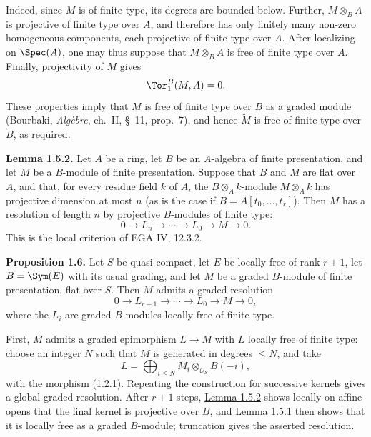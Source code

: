 Indeed, since \(M\) is of finite type, its degrees are bounded below. Further, \(M\otimes_B A\) is projective of finite type over \(A\), and therefore has only finitely many non-zero homogeneous components, each projective of finite type over \(A\). After localizing on \(\Spec(A)\), one may thus suppose that \(M\otimes_B A\) is free of finite type over \(A\). Finally, projectivity of \(M\) gives
\[
 \Tor_1^B(M,A)=0.
\]
These properties imply that \(M\) is free of finite type over \(B\) as a graded module (Bourbaki, \emph{Algèbre}, ch.~II, \S~11, prop.~7), and hence \(\widetilde M\) is free of finite type over \(\widetilde B\), as required.

\textbf{Lemma 1.5.2.} Let \(A\) be a ring, let \(B\) be an \(A\)-algebra of finite presentation, and let \(M\) be a \(B\)-module of finite presentation. Suppose that \(B\) and \(M\) are flat over \(A\), and that, for every residue field \(k\) of \(A\), the \(B\otimes_A k\)-module \(M\otimes_A k\) has projective dimension at most \(n\) (as is the case if \(B=A[t_0,\ldots,t_r]\)). Then \(M\) has a resolution of length \(n\) by projective \(B\)-modules of finite type:
\[
  0\longrightarrow L_n\longrightarrow\cdots\longrightarrow L_0\longrightarrow M\longrightarrow 0.
\]
This is the local criterion of EGA IV, 12.3.2.

\textbf{Proposition 1.6.} Let \(S\) be quasi-compact, let \(E\) be locally free of rank \(r+1\), let \(B=\Sym(E)\) with its usual grading, and let \(M\) be a graded \(B\)-module of finite presentation, flat over \(S\). Then \(M\) admits a graded resolution
\[
  0\longrightarrow L_{r+1}\longrightarrow\cdots\longrightarrow L_0\longrightarrow M\longrightarrow 0,
\]
where the \(L_i\) are graded \(B\)-modules locally free of finite type.

First, \(M\) admits a graded epimorphism \(L\to M\) with \(L\) locally free of finite type: choose an integer \(N\) such that \(M\) is generated in degrees \(\leq N\), and take
\[
  L=\bigoplus_{i\leq N} M_i\otimes_{\mathcal O_S} B(-i),
\]
with the morphism \hyperlink{sga6.e06.eq.1-2-1}{(1.2.1)}. Repeating the construction for successive kernels gives a global graded resolution. After \(r+1\) steps, \hyperlink{sga6.e06.lem.1-5-2}{Lemma 1.5.2} shows locally on affine opens that the final kernel is projective over \(B\), and \hyperlink{sga6.e06.lem.1-5-1}{Lemma 1.5.1} then shows that it is locally free as a graded \(B\)-module; truncation gives the asserted resolution.

